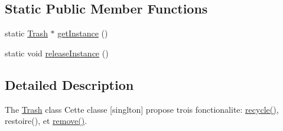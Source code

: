 \subsection*{Static Public Member Functions}
\begin{DoxyCompactItemize}
\item 
static \hyperlink{class_trash}{Trash} $\ast$ \hyperlink{class_trash_a02258d7327ee01ad8e7947a3df664296}{get\-Instance} ()
\item 
static void \hyperlink{class_trash_a299431f9d1b722bf4218d501e2b9ddbd}{release\-Instance} ()
\end{DoxyCompactItemize}


\subsection{Detailed Description}
The \hyperlink{class_trash}{Trash} class Cette classe \mbox{[}singlton\mbox{]} propose trois fonctionalite\-: \hyperlink{class_trash_ac1c39fd789dde908deda27b9bda7882a}{recycle()}, restoire(), et \hyperlink{class_trash_a8e82eefa25891f59c40fd2a66b105694}{remove()}. 

